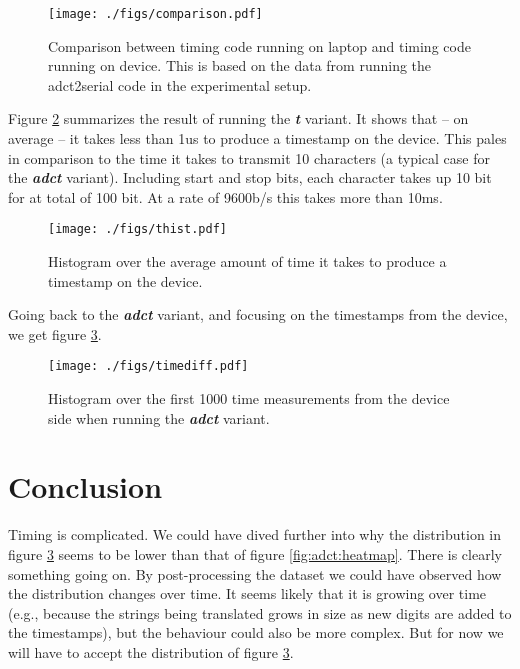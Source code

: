 \documentclass[a4paper]{article}
\newcommand{\textdesc}[1]{\textit{\textbf{#1}}}
\begin{document}
\begin{figure}[btp]
  \begin{center}
    \texttt{[image: ./figs/comparison.pdf]}
  \end{center}
  \caption{\label{fig:adct:comparison} Comparison between timing code running on laptop and timing code running on device. This is based on the data from running the adct2serial code in the experimental setup.}
\end{figure}

Figure \ref{fig:t:hist} summarizes the result of running the \textdesc{t} variant. It shows that -- on average -- it takes less than 1us to produce a timestamp on the device. This pales in comparison to the time it takes to transmit 10 characters (a typical case for the \textdesc{adct} variant). Including start and stop bits, each character takes up 10 bit for at total of 100 bit. At a rate of 9600b/s this takes more than 10ms.

\begin{figure}[btp]
  \begin{center}
    \texttt{[image: ./figs/thist.pdf]}
  \end{center}
  \caption{\label{fig:t:hist} Histogram over the average amount of time it takes to produce a timestamp on the device.}
\end{figure}

Going back to the \textdesc{adct} variant, and focusing on the timestamps from the device, we get figure \ref{fig:adct:timediff}.
\begin{figure}[btp]
  \begin{center}
    \texttt{[image: ./figs/timediff.pdf]}
  \end{center}
  \caption{\label{fig:adct:timediff} Histogram over the first 1000 time measurements from the device side when running the \textdesc{adct} variant.}
\end{figure}

\section{Conclusion}

Timing is complicated. We could have dived further into why the distribution in figure \ref{fig:adct:timediff} seems to be lower than that of figure \ref{fig:adct:heatmap}. There is clearly something going on. By post-processing the dataset we could have observed how the distribution changes over time. It seems likely that it is growing over time (e.g., because the strings being translated grows in size as new digits are added to the timestamps), but the behaviour could also be more complex. But for now we will have to accept the distribution of figure \ref{fig:adct:timediff}.
\end{document}
